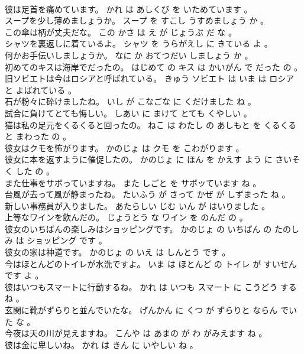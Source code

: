 \documentclass[8pt]{extreport}
\begin{document}
\begin{CJK}{UTF8}{min}
\\	彼は足首を痛めています。	かれ は あしくび を いためています 。 
\\	スープを少し薄めましょうか。	スープ を すこし うすめましょう か 。 
\\	この傘は柄が丈夫だな。	この かさ は え が じょうぶ だ な 。 
\\	シャツを裏返しに着ているよ。	シャツ を うらがえし に きている よ 。 
\\	何かお手伝いしましょうか。	なに か おてつだい しましょう か 。 
\\	初めてのキスは海岸でだったの。	はじめて の キス は かいがん で だった の 。 
\\	旧ソビエトは今はロシアと呼ばれている。	きゅう ソビエト は いま は ロシア と よばれている 。 
\\	石が粉々に砕けましたね。	いし が こなごな に くだけました ね 。 
\\	試合に負けてとても悔しい。	しあい に まけて とても くやしい 。 
\\	猫は私の足元をくるくると回ったの。	ねこ は わたし の あしもと を くるくる と まわった の 。 
\\	彼女はクモを怖がります。	かのじょ は クモ を こわがります 。 
\\	彼女に本を返すように催促したの。	かのじょ に ほん を かえす よう に さいそく した の 。 
\\	また仕事をサボっていますね。	また しごと を サボッています ね 。 
\\	台風が去って風が静まったね。	たいふう が さって かぜ が しずまった ね 。 
\\	新しい事務員が入りました。	あたらしい じむ いん が はいりました 。 
\\	上等なワインを飲んだの。	じょうとう な ワイン を のんだ の 。 
\\	彼女のいちばんの楽しみはショッピングです。	かのじょ の いちばん の たのしみ は ショッピング です 。 
\\	彼女の家は神道です。	かのじょ の いえ は しんとう です 。 
\\	今はほとんどのトイレが水洗ですよ。	いま は ほとんど の トイレ が すいせん です よ 。 
\\	彼はいつもスマートに行動するね。	かれ は いつも スマート に こうどう する ね 。 
\\	玄関に靴がずらりと並んでいたな。	げんかん に くつ が ずらりと ならん でいた な 。 
\\	今夜は天の川が見えますね。	こんや は あまの が わ がみえます ね 。 
\\	彼は金に卑しいね。	かれ は きん に いやしい ね 。 

\end{CJK}
\end{document}
